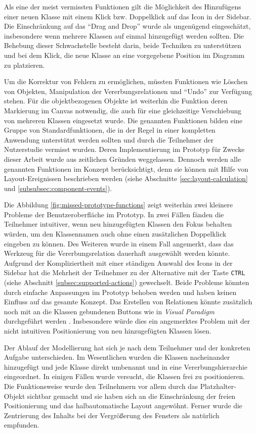 Als eine der meist vermissten Funktionen gilt die Möglichkeit des Hinzufügens einer neuen Klasse mit einem Klick bzw. Doppelklick auf das Icon in der Sidebar. Die Einschränkung auf das \enquote{Drag and Drop} wurde als ungenügend eingeschätzt, insbesondere wenn mehrere Klassen auf einmal hinzugefügt werden sollten. Die Behebung dieser Schwachstelle besteht darin, beide Techniken zu unterstützen und bei dem Klick, die neue Klasse an eine vorgegebene Position im Diagramm zu platzieren.

Um die Korrektur von Fehlern zu ermöglichen, müssten Funktionen wie Löschen von Objekten, Manipulation der Vererbungsrelationen und \enquote{Undo} zur Verfügung stehen. Für die objektbezogenen Objekte ist weiterhin die Funktion deren Markierung im Canvas notwendig, die auch für eine gleichzeitige Verschiebung von mehreren Klassen eingesetzt wurde. Die genannten Funktionen bilden eine Gruppe von Standardfunktionen, die in der Regel in einer kompletten Anwendung unterstützt werden sollten und durch die Teilnehmer der Nutzerstudie vermisst wurden. Deren Implementierung im Prototyp für Zwecke dieser Arbeit wurde aus zeitlichen Gründen weggelassen. Dennoch werden alle genannten Funktionen im Konzept berücksichtigt, denn sie können mit Hilfe von Layout-Ereignissen beschrieben werden (siehe Abschnitte \ref{sec:layout-calculation} und \ref{subsubsec:component-events}).

Die Abbildung \ref{fig:missed-prototype-functions} zeigt weiterhin zwei kleinere Probleme der Benutzeroberfläche im Prototyp. In zwei Fällen fänden die Teilnehmer intuitiver, wenn neu hinzugefügten Klassen den Fokus behalten würden, um den Klassennamen auch ohne einen zusätzlichen Doppelklick eingeben zu können. Des Weiteren wurde in einem Fall angemerkt, dass das Werkzeug für die Vererbungsrelation dauerhaft ausgewählt werden könnte. Aufgrund der Kompliziertheit mit einer ständigen Auswahl des Icons in der Sidebar hat die Mehrheit der Teilnehmer zu der Alternative mit der Taste \texttt{CTRL} (siehe Abschnitt \ref{subsec:supported-actions}) gewechselt. Beide Probleme könnten durch einfache Anpassungen im Prototyp behoben werden und haben keinen Einfluss auf das gesamte Konzept. Das Erstellen von Relationen könnte zusätzlich noch mit an die Klassen gebundenen Buttons wie in \textit{Visual Paradigm} durchgeführt werden \cite{14Visual}. Insbesondere würde dies ein angemerktes Problem mit der nicht intuitiven Positionierung von neu hinzugefügten Klassen lösen.

Der Ablauf der Modellierung hat sich je nach dem Teilnehmer und der konkreten Aufgabe unterschieden. Im Wesentlichen wurden die Klassen nacheinander hinzugefügt und jede Klasse direkt umbenannt und in eine Vererbungshierarchie eingeordnet. In einigen Fällen wurde versucht, die Klassen frei zu positionieren. Die Funktionsweise wurde den Teilnehmern vor allem durch das Platzhalter-Objekt sichtbar gemacht und sie haben sich an die Einschränkung der freien Positionierung und das halbautomatische Layout angewöhnt. Ferner wurde die Zentrierung des Inhalts bei der Vergrößerung des Fensters als natürlich empfunden.

